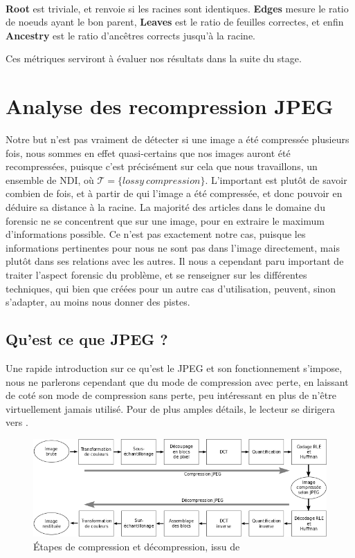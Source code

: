 \documentclass[utf8]{stageM2R} %
\begin{document}
\paragraph{}

\textbf{Root} est triviale, et renvoie si les racines sont identiques. \textbf{Edges} mesure le ratio de noeuds ayant le bon parent, \textbf{Leaves} est le ratio de feuilles correctes, et enfin \textbf{Ancestry} est le ratio d'ancêtres corrects jusqu'à la racine.

Ces métriques serviront à évaluer nos résultats dans la suite du stage.

\section{Analyse des recompression JPEG}
\label{detail_jpeg}
Notre but n'est pas vraiment de détecter si une image a été compressée plusieurs fois, nous sommes en effet quasi-certains que nos images auront été recompressées, puisque c'est précisément sur cela que nous travaillons, un ensemble de NDI, où $\mathcal{T} = {\{lossy\ compression\}}$. L'important est plutôt de savoir combien de fois, et à partir de qui l'image a été compressée, et donc pouvoir en déduire sa distance à la racine. La majorité des articles dans le domaine du forensic ne se concentrent que sur une image, pour en extraire le maximum d'informations possible. Ce n'est pas exactement notre cas, puisque les informations pertinentes pour nous ne sont pas dans l'image directement, mais plutôt dans ses relations avec les autres. Il nous a cependant paru important de traiter l'aspect forensic du problème, et se renseigner sur les différentes techniques, qui bien que créées pour un autre cas d'utilisation, peuvent, sinon s'adapter, au moins nous donner des pistes.

\subsection{Qu'est ce que JPEG ?}
Une rapide introduction sur ce qu'est le JPEG et son fonctionnement s'impose, nous ne parlerons cependant que du mode de compression avec perte, en laissant de coté son mode de compression sans perte, peu intéressant en plus de n'être virtuellement jamais utilisé. Pour de plus amples détails, le lecteur se dirigera vers \cite{wallace1992jpeg}.

\begin{figure}[H]
  \begin{center}
    \includegraphics[width=120mm]{images/jpeg.png}
    \caption{Étapes de compression et décompression, issu de \cite{jpeg}}
    \label{fig:jpeg}
  \end{center}
\end{figure}
\end{document}
